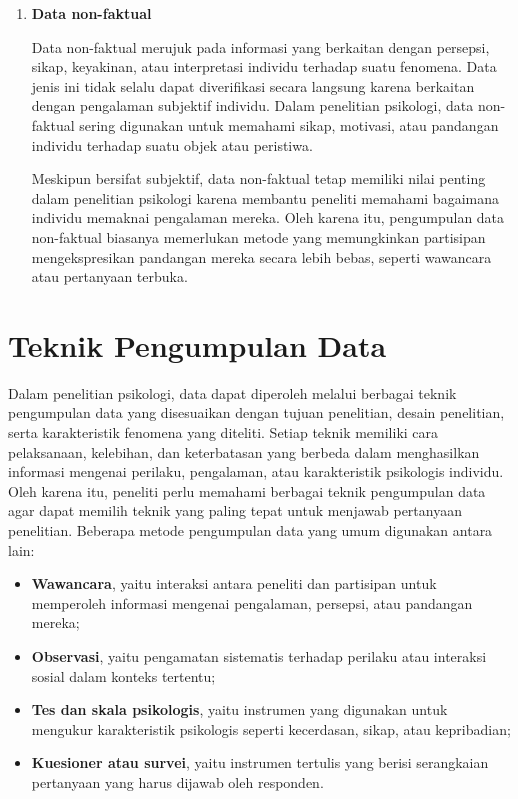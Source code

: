 \documentclass[
  indonesian,
  letterpaper,
  DIV=11,
  numbers=noendperiod]{scrreprt}
\providecommand{\tightlist}{%
  \setlength{\itemsep}{0pt}\setlength{\parskip}{0pt}}
\begin{document}
\begin{enumerate}
\begin{enumerate}
    Karena sifatnya yang relatif objektif, data faktual biasanya lebih
    mudah dianalisis dan dibandingkan antarpartisipan. Namun, data ini
    tidak selalu mampu menggambarkan makna subjektif yang dimiliki
    individu terhadap suatu pengalaman.
  \item
    \textbf{Data non-faktual}

    Data non-faktual merujuk pada informasi yang berkaitan dengan
    persepsi, sikap, keyakinan, atau interpretasi individu terhadap
    suatu fenomena. Data jenis ini tidak selalu dapat diverifikasi
    secara langsung karena berkaitan dengan pengalaman subjektif
    individu. Dalam penelitian psikologi, data non-faktual sering
    digunakan untuk memahami sikap, motivasi, atau pandangan individu
    terhadap suatu objek atau peristiwa.

    Meskipun bersifat subjektif, data non-faktual tetap memiliki nilai
    penting dalam penelitian psikologi karena membantu peneliti memahami
    bagaimana individu memaknai pengalaman mereka. Oleh karena itu,
    pengumpulan data non-faktual biasanya memerlukan metode yang
    memungkinkan partisipan mengekspresikan pandangan mereka secara
    lebih bebas, seperti wawancara atau pertanyaan terbuka.
  \end{enumerate}
\end{enumerate}

\section{Teknik Pengumpulan Data}\label{teknik-pengumpulan-data}

Dalam penelitian psikologi, data dapat diperoleh melalui berbagai teknik
pengumpulan data yang disesuaikan dengan tujuan penelitian, desain
penelitian, serta karakteristik fenomena yang diteliti. Setiap teknik
memiliki cara pelaksanaan, kelebihan, dan keterbatasan yang berbeda
dalam menghasilkan informasi mengenai perilaku, pengalaman, atau
karakteristik psikologis individu. Oleh karena itu, peneliti perlu
memahami berbagai teknik pengumpulan data agar dapat memilih teknik yang
paling tepat untuk menjawab pertanyaan penelitian. Beberapa metode
pengumpulan data yang umum digunakan antara lain:

\begin{itemize}
\tightlist
\item
  \textbf{Wawancara}, yaitu interaksi antara peneliti dan partisipan
  untuk memperoleh informasi mengenai pengalaman, persepsi, atau
  pandangan mereka;
\item
  \textbf{Observasi}, yaitu pengamatan sistematis terhadap perilaku atau
  interaksi sosial dalam konteks tertentu;
\item
  \textbf{Tes dan skala psikologis}, yaitu instrumen yang digunakan
  untuk mengukur karakteristik psikologis seperti kecerdasan, sikap,
  atau kepribadian;
\item
  \textbf{Kuesioner atau survei}, yaitu instrumen tertulis yang berisi
  serangkaian pertanyaan yang harus dijawab oleh responden.
\end{itemize}
\end{document}
